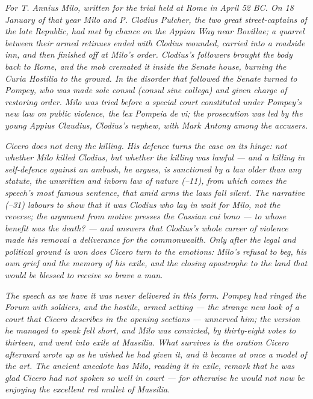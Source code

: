 
\textit{For T. Annius Milo, written for the trial held
at Rome in April 52 BC. On 18 January of that year Milo
and P. Clodius Pulcher, the two great street-captains of
the late Republic, had met by chance on the Appian Way
near Bovillae; a quarrel between their armed retinues
ended with Clodius wounded, carried into a roadside inn,
and then finished off at Milo's order. Clodius's
followers brought the body back to Rome, and the mob
cremated it inside the Senate house, burning the Curia
Hostilia to the ground. In the disorder that followed
the Senate turned to Pompey, who was made sole consul
(\textit{consul sine collega}) and given charge of
restoring order. Milo was tried before a special court
constituted under Pompey's new law on public violence,
the lex Pompeia de vi; the prosecution was led by the
young Appius Claudius, Clodius's nephew, with Mark
Antony among the accusers.}

\textit{Cicero does not deny the killing. His defence
turns the case on its hinge: not whether Milo killed
Clodius, but whether the killing was lawful --- and a
killing in self-defence against an ambush, he argues, is
sanctioned by a law older than any statute, the unwritten
and inborn law of nature (\textsection{}--11), from which comes the speech's most famous
sentence, that amid arms the laws fall silent. The
narrative (\textsection{}--31) labours to
show that it was Clodius who lay in wait for Milo, not
the reverse; the argument from motive presses the
Cassian \textit{cui bono} --- to whose benefit was the
death? --- and answers that Clodius's whole career of
violence made his removal a deliverance for the
commonwealth. Only after the legal and political ground
is won does Cicero turn to the emotions: Milo's refusal
to beg, his own grief and the memory of his exile, and
the closing apostrophe to the land that would be blessed
to receive so brave a man.}

\textit{The speech as we have it was never delivered in
this form. Pompey had ringed the Forum with soldiers,
and the hostile, armed setting --- the strange new look
of a court that Cicero describes in the opening
sections --- unnerved him; the version he managed to
speak fell short, and Milo was convicted, by thirty-eight
votes to thirteen, and went into exile at Massilia. What
survives is the oration Cicero afterward wrote up as he
wished he had given it, and it became at once a model of
the art. The ancient anecdote has Milo, reading it in
exile, remark that he was glad Cicero had not spoken so
well in court --- for otherwise he would not now be
enjoying the excellent red mullet of Massilia.}
